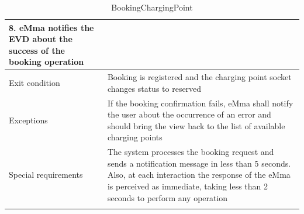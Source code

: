 \begin{center}
\begin{longtable}{p{4cm} p{11cm}}
        8. eMma notifies the EVD about the success of the booking operation\\
     \hline
     Exit condition &  Booking is registered and the charging point socket changes status to reserved\\
     \hline
     Exceptions &
        If the booking confirmation fails, eMma shall notify the user about the occurrence of an error and should bring the view back to the list of available charging points\\
     \hline
     Special requirements &  
        The system processes the booking request and sends a notification message in less than 5 seconds. Also, at each interaction the response of the eMma is perceived as immediate, taking less than 2 seconds to perform any operation\\
     \hline
    \caption{BookingChargingPoint}
    \label{tab:BookingChargingPoint}
    \end{longtable}
\end{center}


